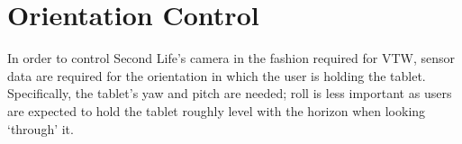 

\section{Orientation Control}

\label{OrientationControl}

\newcommand{\ArduinoFootnote}{\footnote{\url{http://www.arduino.cc/}}}

\newcommand{\MMAfootnote}{\footnote{\url{http://cache.freescale.com/files/sensors/doc/data_sheet/MMA8452Q.pdf}}}

\newcommand{\ADXLfootnote}{\footnote{\url{http://www.analog.com/static/imported-files/data_sheets/ADXL335.pdf}}}

\newcommand{\HMCfootnote}{\footnote{\url{http://www51.honeywell.com/aero/common/documents/myaerospacecatalog-documents/Defense_Brochures-documents/HMC5883L_3-Axis_Digital_Compass_IC.pdf}}}

\newcommand{\HMCtwoFootnote}{\footnote{\url{http://www51.honeywell.com/aero/common/documents/myaerospacecatalog-documents/Missiles-Munitions/HMC6343.pdf}}}

\newcommand{\HMCvccFootnote}{\footnote{The HMC6343 requires 2.7 to 3.6V input on VCC/VDD, this table showing connection to 5V assumes a HMC6343 breakout with appropriate step down.}}

\newcommand{\itwocFootnote}{\footnote{The HMC6343's I2C lines must be pulled up to 3.3V, this table shows connection to an Arduino Uno R3's I2C lines which are pulled up to 5V assuming a HMC6343 breakout with appropriate level shifters.}}



In order to control Second Life's camera in the fashion required for VTW, sensor data are required for the orientation in which the user is holding the tablet. Specifically, the tablet's yaw and pitch are needed; roll is less important as users are expected to hold the tablet roughly level with the horizon when looking `through' it.

